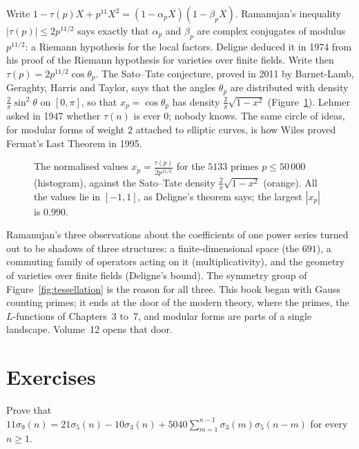 \begin{remark}
Write $1-\tau(p)X+p^{11}X^2=(1-\alpha_pX)(1-\beta_pX)$. Ramanujan's inequality $|\tau(p)|\le2p^{11/2}$ says exactly that $\alpha_p$ and $\beta_p$ are complex conjugates of modulus $p^{11/2}$: a Riemann hypothesis
for the local factors. Deligne deduced it in 1974 from his proof of the Riemann hypothesis for varieties over finite fields. Write then $\tau(p)=2p^{11/2}\cos\theta_p$. The Sato--Tate conjecture, proved in 2011 by Barnet-Lamb, Geraghty, Harris and Taylor,
says that the angles $\theta_p$ are distributed with density $\frac2\pi\sin^2\theta$ on $[0,\pi]$, so that $x_p=\cos\theta_p$ has density $\frac2\pi\sqrt{1-x^2}$ (Figure~\ref{fig:satotate}). Lehmer asked in 1947 whether $\tau(n)$ is ever $0$;
nobody knows. The same circle of ideas, for modular forms of weight $2$ attached to elliptic curves, is how Wiles proved Fermat's Last Theorem in 1995.
\end{remark}

\begin{figure}[ht]
\centering
{}
\caption{The normalised values $x_p=\frac{\tau(p)}{2p^{11/2}}$ for the $5133$ primes $p\le50\,000$ (histogram), against the Sato--Tate density $\frac2\pi\sqrt{1-x^2}$ (orange). All the values lie in $[-1,1]$, as Deligne's
theorem says; the largest $|x_p|$ is $0.990$.}
\label{fig:satotate}
\end{figure}

\begin{beauty}
Ramanujan's three observations about the coefficients of one power series turned out to be shadows of three structures: a finite-dimensional space (the $691$), a commuting family of operators acting on it
(multiplicativity), and the geometry of varieties over finite fields (Deligne's bound). The symmetry group of Figure~\ref{fig:tessellation} is the reason for all three. This book began with Gauss counting primes; it ends at the door
of the modern theory, where the primes, the $L$-functions of Chapters~3 to~7, and modular forms are parts of a single landscape. Volume~12 opens that door.
\end{beauty}

\section{Exercises}

\begin{exercise}[$\star$]\label{ex:sigma9}
Prove that $11\sigma_9(n)=21\sigma_5(n)-10\sigma_3(n)+5040\sum_{m=1}^{n-1}\sigma_3(m)\sigma_5(n-m)$ for every $n\ge1$.
\end{exercise}

